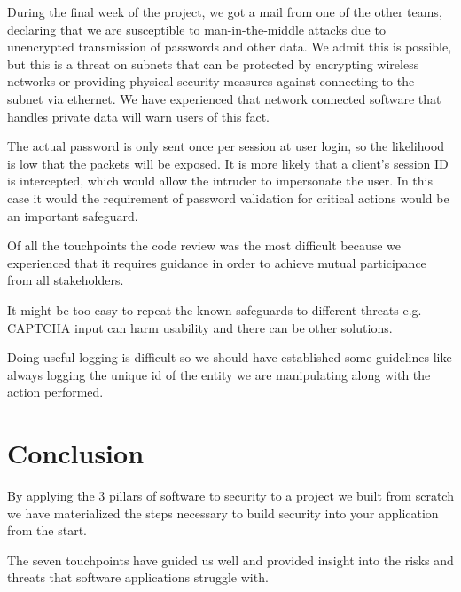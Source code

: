 \documentclass[a4paper]{article}
\begin{document}
During the final week of the project, we got a mail from one of the other teams, declaring that we are susceptible to man-in-the-middle attacks due to unencrypted transmission of passwords and other data. We admit this is possible, but this is a threat on subnets that can be protected by encrypting wireless networks or providing physical security measures against connecting to the subnet via ethernet. We have experienced that network connected software that handles private data will warn users of this fact.

The actual password is only sent once per session at user login, so the likelihood is low that the packets will be exposed. It is more likely that a client's session ID is intercepted, which would allow the intruder to impersonate the user. In this case it would the requirement of password validation for critical actions would be an important safeguard.

Of all the touchpoints the code review was the most difficult because we experienced that it requires guidance in order to achieve mutual participance from all stakeholders.

It might be too easy to repeat the known safeguards to different threats e.g. CAPTCHA input can harm usability and there can be other solutions. 

Doing useful logging is difficult so we should have established some guidelines like always logging the unique id of the entity we are manipulating along with the action performed.


\section{Conclusion}

By applying the 3 pillars of software to security to a project we built from scratch we have materialized the steps necessary to build security into your application from the start.

The seven touchpoints have guided us well and provided insight into the risks and threats that software applications struggle with.

\end{document}
